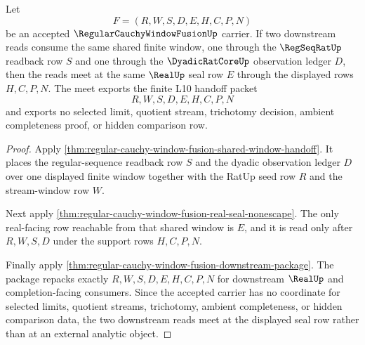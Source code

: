 \begin{theorem}
\label{thm:regular-cauchy-window-fusion-budget-meet}
Let
$$
F=(R,W,S,D,E,H,C,P,N)
$$
be an accepted $\RegularCauchyWindowFusionUp$ carrier. If two downstream reads consume the same shared finite window, one through the $\RegSeqRatUp$ readback row $S$ and one through the $\DyadicRatCoreUp$ observation ledger $D$, then the reads meet at the same $\RealUp$ seal row $E$ through the displayed rows $H,C,P,N$. The meet exports the finite L10 handoff packet
$$
R,W,S,D,E,H,C,P,N
$$
and exports no selected limit, quotient stream, trichotomy decision, ambient completeness proof, or hidden comparison row.
\end{theorem}
\begin{proof}
Apply \autoref{thm:regular-cauchy-window-fusion-shared-window-handoff}. It places the regular-sequence readback row $S$ and the dyadic observation ledger $D$ over one displayed finite window together with the RatUp seed row $R$ and the stream-window row $W$.

Next apply \autoref{thm:regular-cauchy-window-fusion-real-seal-nonescape}. The only real-facing row reachable from that shared window is $E$, and it is read only after $R,W,S,D$ under the support rows $H,C,P,N$.

Finally apply \autoref{thm:regular-cauchy-window-fusion-downstream-package}. The package repacks exactly $R,W,S,D,E,H,C,P,N$ for downstream $\RealUp$ and completion-facing consumers. Since the accepted carrier has no coordinate for selected limits, quotient streams, trichotomy, ambient completeness, or hidden comparison data, the two downstream reads meet at the displayed seal row rather than at an external analytic object.
\end{proof}

